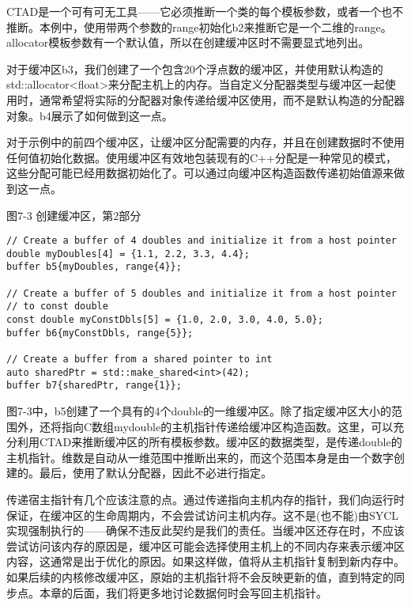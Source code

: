 CTAD是一个可有可无工具——它必须推断一个类的每个模板参数，或者一个也不推断。本例中，使用带两个参数的range初始化b2来推断它是一个二维的range。allocator模板参数有一个默认值，所以在创建缓冲区时不需要显式地列出。\par

对于缓冲区b3，我们创建了一个包含20个浮点数的缓冲区，并使用默认构造的std::allocator<float>来分配主机上的内存。当自定义分配器类型与缓冲区一起使用时，通常希望将实际的分配器对象传递给缓冲区使用，而不是默认构造的分配器对象。b4展示了如何做到这一点。\par

对于示例中的前四个缓冲区，让缓冲区分配需要的内存，并且在创建数据时不使用任何值初始化数据。使用缓冲区有效地包装现有的C++分配是一种常见的模式，这些分配可能已经用数据初始化了。可以通过向缓冲区构造函数传递初始值源来做到这一点。\par

\hspace*{\fill} \par %
图7-3 创建缓冲区，第2部分
\begin{lstlisting}[caption={}]
// Create a buffer of 4 doubles and initialize it from a host pointer
double myDoubles[4] = {1.1, 2.2, 3.3, 4.4};
buffer b5{myDoubles, range{4}};

// Create a buffer of 5 doubles and initialize it from a host pointer 
// to const double
const double myConstDbls[5] = {1.0, 2.0, 3.0, 4.0, 5.0};
buffer b6{myConstDbls, range{5}};

// Create a buffer from a shared pointer to int
auto sharedPtr = std::make_shared<int>(42);
buffer b7{sharedPtr, range{1}};
\end{lstlisting}

图7-3中，b5创建了一个具有的4个double的一维缓冲区。除了指定缓冲区大小的范围外，还将指向C数组mydouble的主机指针传递给缓冲区构造函数。这里，可以充分利用CTAD来推断缓冲区的所有模板参数。缓冲区的数据类型，是传递double的主机指针。维数是自动从一维范围中推断出来的，而这个范围本身是由一个数字创建的。最后，使用了默认分配器，因此不必进行指定。\par

传递宿主指针有几个应该注意的点。通过传递指向主机内存的指针，我们向运行时保证，在缓冲区的生命周期内，不会尝试访问主机内存。这不是(也不能)由SYCL实现强制执行的——确保不违反此契约是我们的责任。当缓冲区还存在时，不应该尝试访问该内存的原因是，缓冲区可能会选择使用主机上的不同内存来表示缓冲区内容，这通常是出于优化的原因。如果这样做，值将从主机指针复制到新内存中。如果后续的内核修改缓冲区，原始的主机指针将不会反映更新的值，直到特定的同步点。本章的后面，我们将更多地讨论数据何时会写回主机指针。\par

